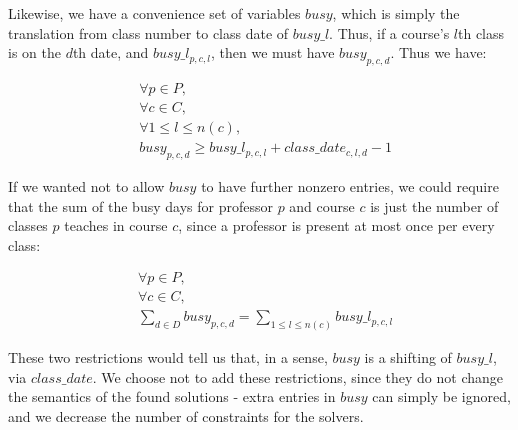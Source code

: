 Likewise, we have a convenience set of variables $busy$, which is simply the translation from class number to class date of $busy\_l$. Thus, if a course's $l$th class is on the $d$th date, and $busy\_l_{p, c, l}$, then we must have $busy_{p, c, d}$. Thus we have:

\begin{align}
  &\forall p \in P,\\
  &\forall c \in C,\\
  &\forall 1 \le l \le n(c),\\
  &busy_{p, c, d} \ge busy\_l_{p, c, l} + class\_date_{c, l, d} - 1
\end{align}

If we wanted not to allow $busy$ to have further nonzero entries, we could require that the sum of the busy days for professor $p$ and course $c$ is just the number of classes $p$ teaches in course $c$, since a professor is present at most once per every class:

\begin{align}
  &\forall p \in P,\\
  &\forall c \in C,\\
  &\sum_{d \in D} busy_{p, c, d} = \sum_{1 \le l \le n(c)} busy\_l_{p, c, l}
\end{align}

These two restrictions would tell us that, in a sense, $busy$ is a shifting of $busy\_l$, via $class\_date$. We choose not to add these restrictions, since they do not change the semantics of the found solutions - extra entries in $busy$ can simply be ignored, and we decrease the number of constraints for the solvers.
